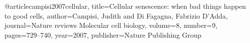 @article{campisi2007cellular,
  title={Cellular senescence: when bad things happen to good cells},
  author={Campisi, Judith and Di Fagagna, Fabrizio D'Adda},
  journal={Nature reviews Molecular cell biology},
  volume={8},
  number={9},
  pages={729--740},
  year={2007},
  publisher={Nature Publishing Group}
}
